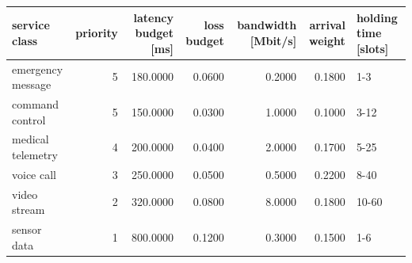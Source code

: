 \begin{tabular}{lrrrrrl}
\toprule
service class & priority & latency budget [ms] & loss budget & bandwidth [Mbit/s] & arrival weight & holding time [slots] \\
\midrule
emergency message & 5 & 180.0000 & 0.0600 & 0.2000 & 0.1800 & 1-3 \\
command control & 5 & 150.0000 & 0.0300 & 1.0000 & 0.1000 & 3-12 \\
medical telemetry & 4 & 200.0000 & 0.0400 & 2.0000 & 0.1700 & 5-25 \\
voice call & 3 & 250.0000 & 0.0500 & 0.5000 & 0.2200 & 8-40 \\
video stream & 2 & 320.0000 & 0.0800 & 8.0000 & 0.1800 & 10-60 \\
sensor data & 1 & 800.0000 & 0.1200 & 0.3000 & 0.1500 & 1-6 \\
\bottomrule
\end{tabular}
